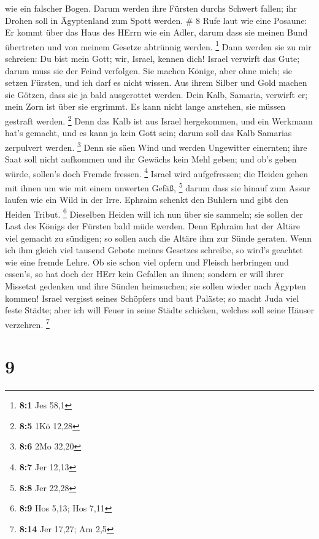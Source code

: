 wie ein falscher Bogen. Darum werden ihre Fürsten durchs Schwert fallen;
ihr Drohen soll in Ägyptenland zum Spott werden. \# 8  Rufe
laut wie eine Posaune: Er kommt über das Haus des HErrn wie ein Adler,
darum dass sie meinen Bund übertreten und von meinem Gesetze abtrünnig
werden. \footnote{\textbf{8:1} Jes 58,1}  Dann werden sie zu
mir schreien: Du bist mein Gott; wir, Israel, kennen dich! 
Israel verwirft das Gute; darum muss sie der Feind verfolgen.
 Sie machen Könige, aber ohne mich; sie setzen Fürsten, und
ich darf es nicht wissen. Aus ihrem Silber und Gold machen sie Götzen,
dass sie ja bald ausgerottet werden.  Dein Kalb, Samaria,
verwirft er; mein Zorn ist über sie ergrimmt. Es kann nicht lange
anstehen, sie müssen gestraft werden. \footnote{\textbf{8:5} 1Kö 12,28}
 Denn das Kalb ist aus Israel hergekommen, und ein Werkmann
hat's gemacht, und es kann ja kein Gott sein; darum soll das Kalb
Samarias zerpulvert werden. \footnote{\textbf{8:6} 2Mo 32,20}
 Denn sie säen Wind und werden Ungewitter einernten; ihre
Saat soll nicht aufkommen und ihr Gewächs kein Mehl geben; und ob's
geben würde, sollen's doch Fremde fressen. \footnote{\textbf{8:7} Jer
  12,13}  Israel wird aufgefressen; die Heiden gehen mit
ihnen um wie mit einem unwerten Gefäß, \footnote{\textbf{8:8} Jer 22,28}
 darum dass sie hinauf zum Assur laufen wie ein Wild in der
Irre. Ephraim schenkt den Buhlern und gibt den Heiden Tribut.
\footnote{\textbf{8:9} Hos 5,13; Hos 7,11}  Dieselben
Heiden will ich nun über sie sammeln; sie sollen der Last des Königs der
Fürsten bald müde werden.  Denn Ephraim hat der Altäre viel
gemacht zu sündigen; so sollen auch die Altäre ihm zur Sünde geraten.
 Wenn ich ihm gleich viel tausend Gebote meines Gesetzes
schreibe, so wird's geachtet wie eine fremde Lehre.  Ob sie
schon viel opfern und Fleisch herbringen und essen's, so hat doch der
HErr kein Gefallen an ihnen; sondern er will ihrer Missetat gedenken und
ihre Sünden heimsuchen; sie sollen wieder nach Ägypten kommen!
 Israel vergisst seines Schöpfers und baut Paläste; so
macht Juda viel feste Städte; aber ich will Feuer in seine Städte
schicken, welches soll seine Häuser verzehren. \footnote{\textbf{8:14}
  Jer 17,27; Am 2,5}

\hypertarget{section-4}{%
\section{9}\label{section-4}}

